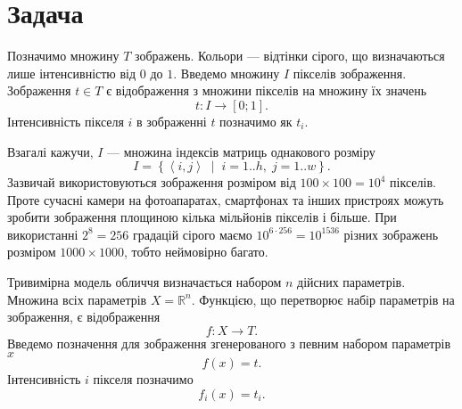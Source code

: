\section{Задача}

Позначимо множину $T$ зображень.
Кольори --- відтінки сірого, що визначаються лише інтенсивністю від $0$ до $1$.
Введемо множину $I$ пікселів зображення.
Зображення $t \in T$ є відображення з множини пікселів на множину їх значень
\begin{equation*}
  t: I \rightarrow \left[ 0; 1 \right].
\end{equation*}
Інтенсивність пікселя $i$ в зображенні $t$ позначимо як $t_i$.

Взагалі кажучи, $I$ --- множина індексів матриць однакового розміру
\begin{equation*}
  I = \left\{ \left\langle i, j \right\rangle
    \;\middle|\; i = 1..h,\; j = 1..w \right\}.
\end{equation*}
Зазвичай використовуються зображення розміром від
$100 \times 100 = 10^4$ пікселів.
Проте сучасні камери на фотоапаратах, смартфонах та інших пристроях
можуть зробити зображення площиною кілька мільйонів пікселів і більше.
При використанні $2^8 = 256$ градацій сірого маємо
$10^{6 \cdot 256} = 10^{1536}$ різних зображень розміром $1000 \times 1000$,
тобто неймовірно багато.

Тривимірна модель обличчя визначається набором $n$ дійсних параметрів.
Множина всіх параметрів $X = \mathbb{R}^n$.
Функцією, що перетворює набір параметрів на зображення, є відображення
\begin{equation*}
  f: X \rightarrow T.
\end{equation*}
Введемо позначення для зображення згенерованого з певним набором параметрів $x$
\begin{equation*}
  f\left( x \right) = t.
\end{equation*}
Інтенсивність $i$ пікселя позначимо
\begin{equation*}
  f_i\left( x \right) = t_i.
\end{equation*}

